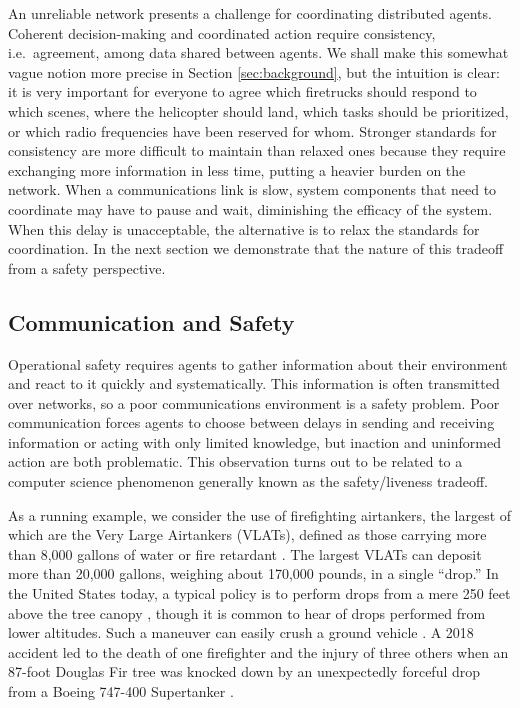\documentclass[]             %
{NASA}                       %
\theoremstyle{definition}
\begin{document}
An unreliable network presents a challenge for coordinating
distributed agents. Coherent decision-making and coordinated action
require consistency, i.e.~agreement, among data shared between
agents. We shall make this somewhat vague notion more precise in
Section \ref{sec:background}, but the intuition is clear: it is very
important for everyone to agree which firetrucks should respond to
which scenes, where the helicopter should land, which tasks should be
prioritized, or which radio frequencies have been reserved for
whom. Stronger standards for consistency are more difficult to
maintain than relaxed ones because they require exchanging more
information in less time, putting a heavier burden on the
network. When a communications link is slow, system components that
need to coordinate may have to pause and wait, diminishing the
efficacy of the system. When this delay is unacceptable, the
alternative is to relax the standards for coordination. In the next
section we demonstrate that the nature of this tradeoff from a safety
perspective.

\subsection{Communication and Safety}
\label{communication-and-safety}
Operational safety requires agents to gather information about their
environment and react to it quickly and systematically. This
information is often transmitted over networks, so a poor
communications environment is a safety problem. Poor communication
forces agents to choose between delays in sending and receiving
information or acting with only limited knowledge, but inaction and
uninformed action are both problematic. This observation turns out to
be related to a computer science phenomenon generally known as the
safety/liveness tradeoff.

As a running example, we consider the use of firefighting airtankers,
the largest of which are the Very Large Airtankers (VLATs), defined as
those carrying more than 8,000 gallons of water or fire retardant
\cite{2019:airtankerops}. The largest VLATs can deposit more than
20,000 gallons, weighing about 170,000 pounds, in a single ``drop.''
In the United States today, a typical policy is to perform drops from
a mere 250 feet above the tree canopy \cite{2019:airtankerops}, though
it is common to hear of drops performed from lower altitudes. Such a
maneuver can easily crush a ground vehicle \cite{2019:stickney}. A
2018 accident led to the death of one firefighter and the injury of
three others when an 87-foot Douglas Fir tree was knocked down by an
unexpectedly forceful drop from a Boeing 747-400 Supertanker
\cite{2018:calfire}.
\end{document}
